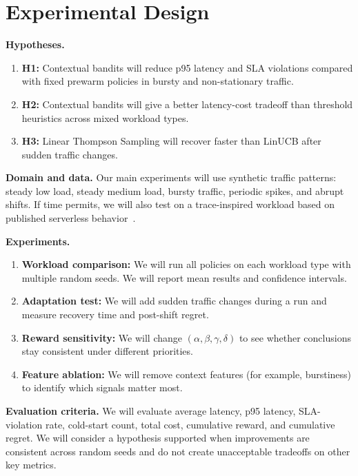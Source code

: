\documentclass{article}
\begin{document}
\section{Experimental Design}
\textbf{Hypotheses.}
\begin{enumerate}[leftmargin=*]
  \item \textbf{H1:} Contextual bandits will reduce p95 latency and SLA violations compared with fixed prewarm policies in bursty and non-stationary traffic.
  \item \textbf{H2:} Contextual bandits will give a better latency-cost tradeoff than threshold heuristics across mixed workload types.
  \item \textbf{H3:} Linear Thompson Sampling will recover faster than LinUCB after sudden traffic changes.
\end{enumerate}

\textbf{Domain and data.}
Our main experiments will use synthetic traffic patterns: steady low load, steady medium load, bursty traffic, periodic spikes, and abrupt shifts. If time permits, we will also test on a trace-inspired workload based on published serverless behavior~\cite{shahrad2020serverless}.

\textbf{Experiments.}
\begin{enumerate}[leftmargin=*]
  \item \textbf{Workload comparison:} We will run all policies on each workload type with multiple random seeds. We will report mean results and confidence intervals.
  \item \textbf{Adaptation test:} We will add sudden traffic changes during a run and measure recovery time and post-shift regret.
  \item \textbf{Reward sensitivity:} We will change $(\alpha,\beta,\gamma,\delta)$ to see whether conclusions stay consistent under different priorities.
  \item \textbf{Feature ablation:} We will remove context features (for example, burstiness) to identify which signals matter most.
\end{enumerate}

\textbf{Evaluation criteria.}
We will evaluate average latency, p95 latency, SLA-violation rate, cold-start count, total cost, cumulative reward, and cumulative regret. We will consider a hypothesis supported when improvements are consistent across random seeds and do not create unacceptable tradeoffs on other key metrics.



\end{document}

